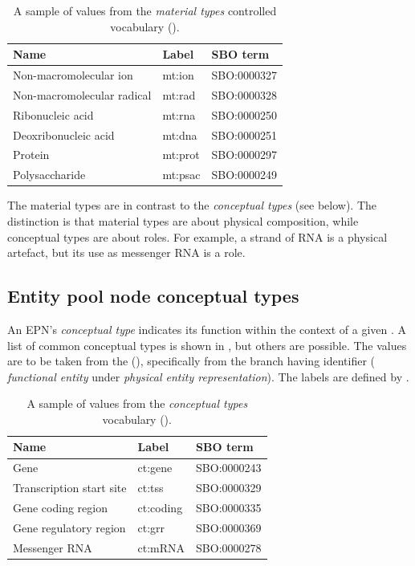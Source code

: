 \begin{table}[h]
  \centering
  \begin{tabular}{l>{\ttfamily}l>{\ttfamily}l}
    \toprule
    \textbf{Name}              & \textbf{\rmfamily Label} & \textbf{\rmfamily SBO term} \\
    \midrule
    Non-macromolecular ion     & mt:ion  & SBO:0000327\\
    Non-macromolecular radical & mt:rad  & SBO:0000328\\
    Ribonucleic acid           & mt:rna  & SBO:0000250\\
    Deoxribonucleic acid       & mt:dna  & SBO:0000251\\
    Protein                    & mt:prot & SBO:0000297\\
    Polysaccharide             & mt:psac & SBO:0000249\\
    \bottomrule
  \end{tabular}
  \caption{A sample of values from the \emph{material types} controlled
    vocabulary ().}
  \label{tab:material-types-cv}
\end{table}

The material types are in contrast to the \emph{conceptual types} (see
below).  The distinction is that material types are about physical
composition, while conceptual types are about roles.  For example, a
strand of RNA is a physical artefact, but its use as messenger RNA is
a role.


\subsection{Entity pool node conceptual types}
\label{sec:conceptual-types-cv}

An EPN's \emph{conceptual type} indicates its function within the
context of a given \PD.  A list of common conceptual types is shown in
, but others are possible.  The values are to
be taken from the \sbo (\sbourl), specifically from the branch having
identifier  ($\!$\emph{functional entity} under
\emph{physical entity representation}).  The labels are defined by \SBGNPDLone.

\begin{table}[h]
  \centering
  \begin{tabular}{l>{\ttfamily}l>{\ttfamily}l}
    \toprule
    \textbf{Name}              & \textbf{\rmfamily Label} & \textbf{\rmfamily SBO term} \\
    \midrule
    Gene                      & ct:gene   & SBO:0000243\\
    Transcription start site  & ct:tss    & SBO:0000329\\
    Gene coding region        & ct:coding & SBO:0000335\\
    Gene regulatory region    & ct:grr    & SBO:0000369\\
    Messenger RNA             & ct:mRNA   & SBO:0000278\\
    \bottomrule
  \end{tabular}
  \caption{A sample of values from the \emph{conceptual types} vocabulary
    ().}
  \label{tab:conceptual-types-cv}
\end{table}


